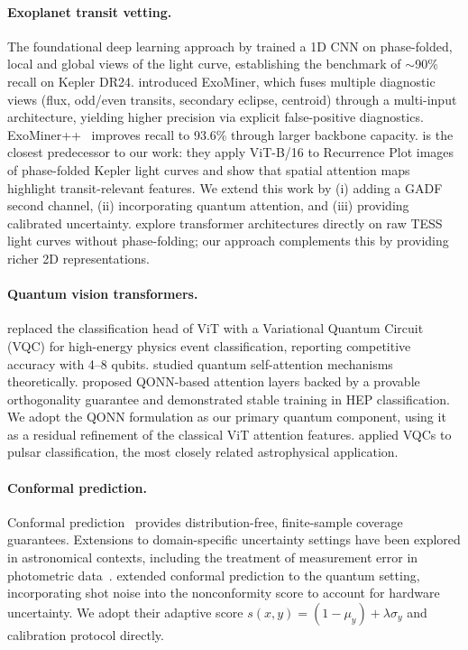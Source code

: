 \documentclass{article}
\begin{document}
\paragraph{Exoplanet transit vetting.}
The foundational deep learning approach by \citet{shallue2018} trained a 1D CNN
on phase-folded, local and global views of the light curve, establishing the
benchmark of $\sim$90\% recall on Kepler DR24.
\citet{valizadegan2022} introduced ExoMiner, which fuses multiple diagnostic
views (flux, odd/even transits, secondary eclipse, centroid) through a
multi-input architecture, yielding higher precision via explicit false-positive
diagnostics.
ExoMiner++~\citep{exominerplusplus2025} improves recall to 93.6\% through
larger backbone capacity.
\citet{choudhary2025} is the closest predecessor to our work: they apply
ViT-B/16 to Recurrence Plot images of phase-folded Kepler light curves and
show that spatial attention maps highlight transit-relevant features.
We extend this work by (i) adding a GADF second channel, (ii) incorporating
quantum attention, and (iii) providing calibrated uncertainty.
\citet{salinas2025} explore transformer architectures directly on raw TESS
light curves without phase-folding; our approach complements this by providing
richer 2D representations.

\paragraph{Quantum vision transformers.}
\citet{unlu2024} replaced the classification head of ViT with a Variational
Quantum Circuit (VQC) for high-energy physics event classification, reporting
competitive accuracy with 4--8 qubits.
\citet{cherrat2022} studied quantum self-attention mechanisms theoretically.
\citet{tesi2024} proposed QONN-based attention layers backed by a provable
orthogonality guarantee and demonstrated stable training in HEP classification.
We adopt the QONN formulation as our primary quantum component, using it as a
residual refinement of the classical ViT attention features.
\citet{souza2025} applied VQCs to pulsar classification, the most closely
related astrophysical application.

\paragraph{Conformal prediction.}
Conformal prediction~\citep{venn2005,angelopoulos2023} provides
distribution-free, finite-sample coverage guarantees.
Extensions to domain-specific uncertainty settings have been explored in
astronomical contexts, including the treatment of measurement error in
photometric data~\citep{singer2025}.
\citet{aqcp2025} extended conformal prediction to the quantum setting,
incorporating shot noise into the nonconformity score to account for hardware
uncertainty.
We adopt their adaptive score $s(x,y) = (1-\mu_y) + \lambda\sigma_y$ and
calibration protocol directly.
\end{document}
